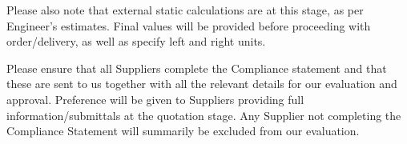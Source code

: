 \documentclass[a4paper,11pt,oneside]{article}
\def\signature{%
 \YL\encl}
\begin{document}
Please also note that external static calculations are at this stage, as per Engineer's estimates. Final values will be provided before proceeding with order/delivery, as well as specify left and right units.


Please ensure that all Suppliers complete the Compliance statement and that these are sent to us together with all the relevant details for our evaluation and approval. Preference will be given to Suppliers providing full information/submittals at the quotation stage. Any Supplier not completing the Compliance Statement will summarily be excluded from our evaluation.



\signature
\end{document}
